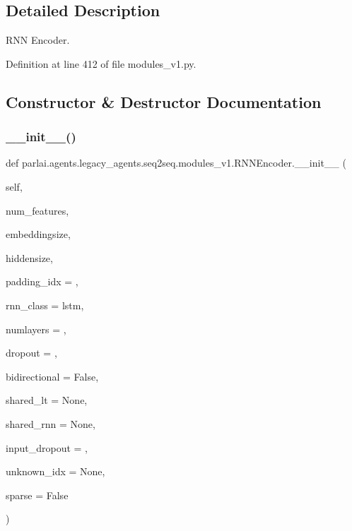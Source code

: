 \subsection{Detailed Description}
\begin{DoxyVerb}RNN Encoder.
\end{DoxyVerb}
 

Definition at line 412 of file modules\+\_\+v1.\+py.



\subsection{Constructor \& Destructor Documentation}
\mbox{\label{classparlai_1_1agents_1_1legacy__agents_1_1seq2seq_1_1modules__v1_1_1RNNEncoder_aafb69318c92833972f488753adef1744}} 
\subsubsection{\texorpdfstring{\+\_\+\+\_\+init\+\_\+\+\_\+()}{\_\_init\_\_()}}
{\footnotesize\ttfamily def parlai.\+agents.\+legacy\+\_\+agents.\+seq2seq.\+modules\+\_\+v1.\+R\+N\+N\+Encoder.\+\_\+\+\_\+init\+\_\+\+\_\+ (\begin{DoxyParamCaption}\item[{}]{self,  }\item[{}]{num\+\_\+features,  }\item[{}]{embeddingsize,  }\item[{}]{hiddensize,  }\item[{}]{padding\+\_\+idx = {},  }\item[{}]{rnn\+\_\+class = {\ttfamily \textquotesingle{}lstm\textquotesingle{}},  }\item[{}]{numlayers = {},  }\item[{}]{dropout = {},  }\item[{}]{bidirectional = {\ttfamily False},  }\item[{}]{shared\+\_\+lt = {\ttfamily None},  }\item[{}]{shared\+\_\+rnn = {\ttfamily None},  }\item[{}]{input\+\_\+dropout = {},  }\item[{}]{unknown\+\_\+idx = {\ttfamily None},  }\item[{}]{sparse = {\ttfamily False} }\end{DoxyParamCaption})}

